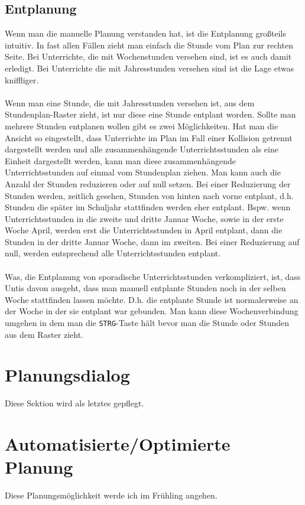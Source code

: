 \subsection{Entplanung}
\label{sec:manuelle-entplanung}

Wenn man die manuelle Planung verstanden hat, ist die Entplanung großteils intuitiv. In fast allen Fällen zieht man einfach die Stunde vom Plan zur rechten Seite. Bei Unterrichte, die mit Wochenstunden versehen sind, ist es auch damit erledigt. Bei Unterrichte die mit Jahresstunden versehen sind ist die Lage etwas kniffliger.\\
\\
Wenn man eine Stunde, die mit Jahresstunden versehen ist, aus dem Stundenplan-Raster zieht, ist nur diese eine Stunde entplant worden. Sollte man mehrere Stunden entplanen wollen gibt es zwei Möglichkeiten. Hat man die Ansicht so eingestellt, dass Unterrichte im Plan im Fall einer Kollision getrennt dargestellt werden und alle zusammenhängende Unterrichtsstunden als eine Einheit dargestellt werden, kann man diese zusammenhängende Unterrichtsstunden auf einmal vom Stundenplan ziehen. Man kann auch die Anzahl der Stunden reduzieren oder auf null setzen. Bei einer Reduzierung der Stunden werden, zeitlich gesehen, Stunden von hinten nach vorne entplant, d.h. Stunden die später im Schuljahr stattfinden werden eher entplant. Bspw. wenn Unterrichtsstunden in die zweite und dritte Januar Woche, sowie in der erste Woche April, werden erst die Unterrichtsstunden in April entplant, dann die Stunden in der dritte Januar Woche, dann im zweiten. Bei einer Reduzierung auf null, werden entsprechend alle Unterrichtsstunden entplant.\\
\\
Was, die Entplanung von sporadische Unterrichtsstunden verkompliziert, ist, dass Untis davon ausgeht, dass man manuell entplante Stunden noch in der selben Woche stattfinden lassen möchte. D.h. die entplante Stunde ist normalerweise an der Woche in der sie entplant war gebunden. Man kann diese Wochenverbindung umgehen in dem man die \texttt{STRG}-Taste hält bevor man die Stunde oder Stunden aus dem Raster zieht.

\section{Planungsdialog}

Diese Sektion wird als letztes gepflegt.

\section{Automatisierte/Optimierte Planung}

Diese Planungsmöglichkeit werde ich im Frühling angehen.













